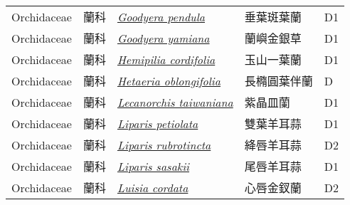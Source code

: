 {\begin{longtable}{L{2.5cm}L{2cm}L{5cm}L{2.5cm}L{3cm}}
    Orchidaceae & 蘭科 & \href{http://www.theplantlist.org/tpl1.1/search?q=Goodyera+pendula}{\textit{Goodyera pendula} } & 垂葉斑葉蘭 & D1    \\
    Orchidaceae & 蘭科 & \href{http://www.theplantlist.org/tpl1.1/search?q=Goodyera+yamiana}{\textit{Goodyera yamiana} } & 蘭嶼金銀草 & D1    \\
    Orchidaceae & 蘭科 & \href{http://www.theplantlist.org/tpl1.1/search?q=Hemipilia+cordifolia}{\textit{Hemipilia cordifolia} } & 玉山一葉蘭 & D1    \\
    Orchidaceae & 蘭科 & \href{http://www.theplantlist.org/tpl1.1/search?q=Hetaeria+oblongifolia}{\textit{Hetaeria oblongifolia} } & 長橢圓葉伴蘭 & D    \\
    Orchidaceae & 蘭科 & \href{http://www.theplantlist.org/tpl1.1/search?q=Lecanorchis+taiwaniana}{\textit{Lecanorchis taiwaniana} } & 紫晶皿蘭 & D1    \\
    Orchidaceae & 蘭科 & \href{http://www.theplantlist.org/tpl1.1/search?q=Liparis+petiolata}{\textit{Liparis petiolata} } & 雙葉羊耳蒜 & D1    \\
    Orchidaceae & 蘭科 & \href{http://www.theplantlist.org/tpl1.1/search?q=Liparis+rubrotincta}{\textit{Liparis rubrotincta} } & 絳唇羊耳蒜 & D2    \\
    Orchidaceae & 蘭科 & \href{http://www.theplantlist.org/tpl1.1/search?q=Liparis+sasakii}{\textit{Liparis sasakii} } & 尾唇羊耳蒜 & D1    \\
    Orchidaceae & 蘭科 & \href{http://www.theplantlist.org/tpl1.1/search?q=Luisia+cordata}{\textit{Luisia cordata} } & 心唇金釵蘭 & D2    \\

\end{longtable}}
